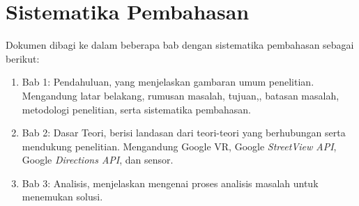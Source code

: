 \section{Sistematika Pembahasan}
\label{sec:sispem}
Dokumen dibagi ke dalam beberapa bab dengan sistematika pembahasan sebagai berikut:
\begin{enumerate}
	\item Bab 1: Pendahuluan, yang menjelaskan gambaran umum penelitian. Mengandung latar belakang, rumusan masalah, tujuan,, batasan masalah, metodologi penelitian, serta sistematika pembahasan.
	\item Bab 2: Dasar Teori, berisi landasan dari teori-teori yang berhubungan serta mendukung penelitian. Mengandung Google VR, Google {\it StreetView API}, Google {\it Directions API}, dan sensor.
	\item Bab 3: Analisis, menjelaskan mengenai proses analisis masalah untuk menemukan solusi. 
\end{enumerate}
